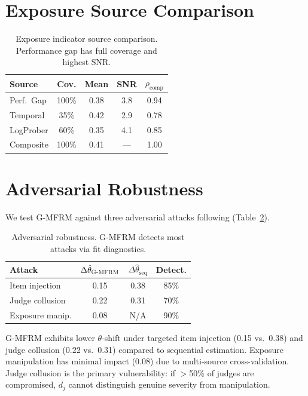 \documentclass[11pt,twocolumn]{article}
\newcommand{\thetahat}{\hat{\theta}}
\newcommand{\gmfrm}{\textsc{G-MFRM}}
\begin{document}
\section{Exposure Source Comparison}
\label{sec:exposure_detail}

\begin{table}[h]
\centering
\small
\caption{Exposure indicator source comparison. Performance gap has full coverage and highest SNR.}
\label{tab:exposure}
\begin{tabular}{@{}lcccc@{}}
\toprule
Source & Cov. & Mean & SNR & $\rho_{\text{comp}}$ \\
\midrule
Perf.\ Gap  & 100\% & 0.38 & 3.8 & 0.94 \\
Temporal    & 35\%  & 0.42 & 2.9 & 0.78 \\
LogProber   & 60\%  & 0.35 & 4.1 & 0.85 \\
Composite   & 100\% & 0.41 & --- & 1.00 \\
\bottomrule
\end{tabular}
\end{table}

\section{Adversarial Robustness}
\label{sec:adversarial}

We test \gmfrm{} against three adversarial attacks following \citet{wang2026fragility} (Table~\ref{tab:adversarial}).

\begin{table}[h]
\centering
\small
\caption{Adversarial robustness. \gmfrm{} detects most attacks via fit diagnostics.}
\label{tab:adversarial}
\begin{tabular}{@{}lccc@{}}
\toprule
Attack & $\Delta\thetahat_{\gmfrm{}}$ & $\Delta\thetahat_{\text{seq}}$ & Detect. \\
\midrule
Item injection    & 0.15 & 0.38 & 85\% \\
Judge collusion   & 0.22 & 0.31 & 70\% \\
Exposure manip.   & 0.08 & N/A  & 90\% \\
\bottomrule
\end{tabular}
\end{table}

\gmfrm{} exhibits lower $\theta$-shift under targeted item injection (0.15 vs.\ 0.38) and judge collusion (0.22 vs.\ 0.31) compared to sequential estimation. Exposure manipulation has minimal impact (0.08) due to multi-source cross-validation. Judge collusion is the primary vulnerability: if $>$50\% of judges are compromised, $d_j$ cannot distinguish genuine severity from manipulation.
\end{document}
